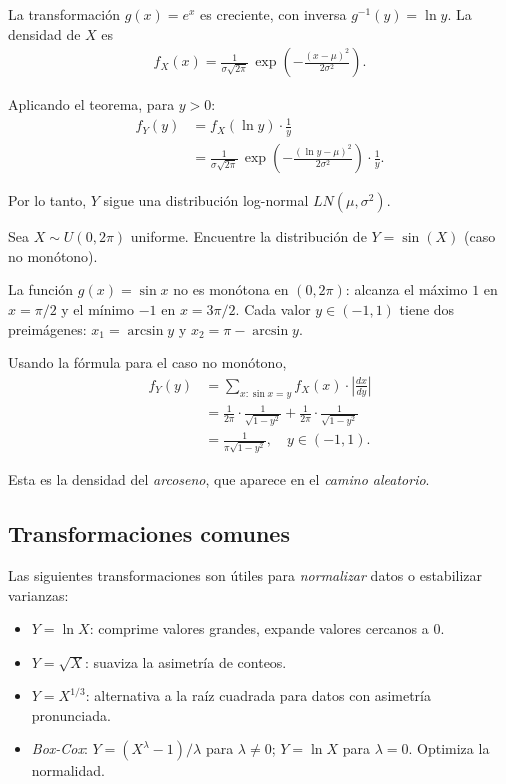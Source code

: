 \begin{solucion}
La transformaci\'on $g(x) = e^x$ es creciente, con inversa $g^{-1}(y) = \ln y$.
La densidad de $X$ es
\begin{align}
 f_X(x) = \frac{1}{\sigma\sqrt{2\pi}}\,\exp\!\left(-\frac{(x-\mu)^2}{2\sigma^2}\right).
\end{align}

Aplicando el teorema, para $y > 0$:
\begin{align}
 f_Y(y) &= f_X(\ln y) \cdot \frac{1}{y} \\
 &= \frac{1}{\sigma\sqrt{2\pi}}\,\exp\!\left(-\frac{(\ln y - \mu)^2}{2\sigma^2}\right) \cdot \frac{1}{y}.
\end{align}

Por lo tanto, $Y$ sigue una distribuci\'on log-normal $LN(\mu, \sigma^2)$.
\end{solucion}

\begin{ejemplo}
 \label{exmp:3.2.4}
Sea $X \sim U(0, 2\pi)$ uniforme. Encuentre la distribuci\'on de $Y = \sin(X)$ (caso
no mon\'otono).
\end{ejemplo}

\begin{solucion}
La funci\'on $g(x) = \sin x$ no es mon\'otona en $(0, 2\pi)$: alcanza el m\'aximo
$1$ en $x = \pi/2$ y el m\'inimo $-1$ en $x = 3\pi/2$. Cada valor $y \in (-1, 1)$
tiene dos preim\'agenes: $x_1 = \arcsin y$ y $x_2 = \pi - \arcsin y$.

Usando la f\'ormula para el caso no mon\'otono,
\begin{align}
 f_Y(y) &= \sum_{x: \sin x = y} f_X(x) \cdot \left|\frac{dx}{dy}\right| \\
 &= \frac{1}{2\pi}\cdot\frac{1}{\sqrt{1-y^2}} + \frac{1}{2\pi}\cdot\frac{1}{\sqrt{1-y^2}} \\
 &= \frac{1}{\pi\sqrt{1-y^2}}, \quad y \in (-1, 1).
\end{align}

Esta es la densidad del \emph{arcoseno}, que aparece en el \emph{camino aleatorio}.
\end{solucion}

\subsection{Transformaciones comunes}

\begin{observacion}
Las siguientes transformaciones son \'utiles para \emph{normalizar} datos o
estabilizar varianzas:
\begin{itemize}
 \item $Y = \ln X$: comprime valores grandes, expande valores cercanos a $0$.
 \item $Y = \sqrt{X}$: suaviza la asimetr\'ia de conteos.
 \item $Y = X^{1/3}$: alternativa a la ra\'iz cuadrada para datos con asimetr\'ia
 pronunciada.
 \item \emph{Box-Cox}: $Y = (X^\lambda - 1)/\lambda$ para $\lambda \neq 0$;
 $Y = \ln X$ para $\lambda = 0$. Optimiza la normalidad.
\end{itemize}
\end{observacion}

